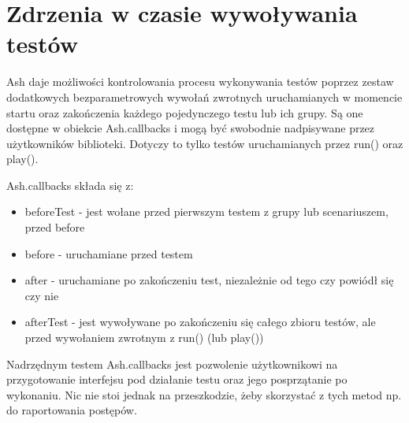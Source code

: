 \documentclass[brudnopis]{xmgr}
\begin{document}
\section{Zdrzenia w czasie wywoływania testów}

Ash daje możliwości kontrolowania procesu wykonywania testów poprzez zestaw dodatkowych bezparametrowych wywołań zwrotnych uruchamianych w momencie startu oraz zakończenia każdego pojedynczego testu lub ich grupy. Są one dostępne w obiekcie Ash.callbacks i mogą być swobodnie nadpisywane przez użytkowników biblioteki. Dotyczy to tylko testów uruchamianych przez run() oraz play().

Ash.callbacks składa się z:

\begin{itemize}
  \item beforeTest - jest wołane przed pierwszym testem z grupy lub scenariuszem, przed before
  \item before - uruchamiane przed testem
  \item after - uruchamiane po zakończeniu test, niezależnie od tego czy powiódł się czy nie
  \item afterTest - jest wywoływane po zakończeniu się całego zbioru testów, ale przed wywołaniem zwrotnym z run() (lub play()) 
\end{itemize}

Nadrzędnym testem Ash.callbacks jest pozwolenie użytkownikowi na przygotowanie interfejsu pod działanie testu oraz jego posprzątanie po wykonaniu. Nic nie stoi jednak na przeszkodzie, żeby skorzystać z tych metod np. do raportowania postępów.
\end{document}
